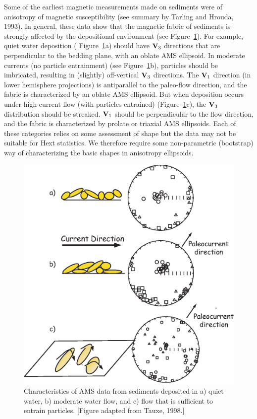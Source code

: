 Some of the earliest magnetic measurements made on sediments were of
anisotropy of magnetic susceptibility (see summary by 
Tarling and Hrouda, 1993). \nocite{tarling93} In general, these data   show that
 the  magnetic fabric of sediments is strongly
affected by the depositional environment  (see Figure~\ref{fig:sedams}). 
For example, quiet water deposition ( Figure~\ref{fig:sedams}a) should have $\hbox{\bf V}_3$ directions that are  perpendicular to the bedding plane, with  an oblate AMS ellipsoid.
 In moderate currents (no particle entrainment) (see Figure~\ref{fig:sedams}b),  particles should be imbricated, resulting in (slightly) off-vertical $\hbox{\bf V}_3$
directions.    The $\hbox{\bf V}_1$ direction (in lower hemisphere projections)
is antiparallel to the paleo-flow direction,  and the fabric is characterized by an oblate AMS ellipsoid.  But when deposition occurs under high current flow (with particles entrained) (Figure~\ref{fig:sedams}c), the $\hbox{\bf V}_3$ distribution should be streaked.     $\hbox{\bf V}_1$ should be perpendicular to  the flow direction, and
the fabric is characterized by prolate or triaxial AMS ellipsoids.     Each of these categories relies on some assessment of shape but the data may not be suitable for Hext statistics.   We therefore require some non-parametric (bootstrap) way of characterizing the basic shapes in anisotropy ellipsoids.  



\begin{figure}[htb]
\centering  \includegraphics[width=12 cm]{EPSfiles/sedams.eps}
\caption{Characteristics of AMS data from sediments deposited in
a) quiet water, b) moderate water flow, and c) flow that is
sufficient to entrain particles.  [Figure adapted from Tauxe, 1998.]
 }
\label{fig:sedams}
\end{figure}

